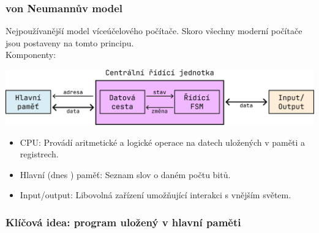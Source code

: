 \documentclass[aspectratio=169,11pt,svgnames,handout]{beamer}
\begin{document}
\begin{frame}
 \frametitle{von Neumannův model}
 Nejpoužívanější model víceúčelového počítače. Skoro všechny moderní počítače
 jsou postaveny na tomto principu.\\
 \pause
 Komponenty:
 \vspace*{-1em}
 \begin{center}
  \includegraphics[width=.75\textwidth]{von-neumann-3.pdf}
 \end{center}
 \begin{itemize}[label=\textbullet]
  \item \alert{CPU}: Provádí aritmetické a logické operace na datech uložených v
   paměti a registrech.
  \item \alert{Hlavní (dnes ) paměť}: Seznam \alert{slov} o daném
   počtu \alert{bitů}.
  \item \alert{Input/output}: Libovolná zařízení umožňující interakci s vnějším
   světem.
 \end{itemize}
\end{frame}

\begin{frame}
 \frametitle{Klíčová idea: program uložený v hlavní paměti}

\end{frame}
\end{document}

